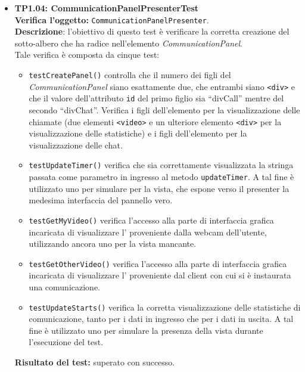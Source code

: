 \begin{itemize}
\item \textbf{TP1.04: CommunicationPanelPresenterTest}\\
\textbf{Verifica l'oggetto:} \texttt{CommunicationPanelPresenter}.\\
\textbf{Descrizione}: l'obiettivo di questo test è verificare la corretta creazione del sotto-albero che ha radice nell'elemento \textit{CommunicationPanel}.\\
Tale verifica è composta da cinque test:
\begin{itemize}
\item \texttt{testCreatePanel()} controlla che il numero dei figli del \textit{CommunicationPanel} siano esattamente due, che entrambi siano \texttt{<div>} e che il valore dell'attributo \texttt{id} del primo figlio sia ``divCall'' mentre del secondo ``divChat''. Verifica i figli dell'elemento per la visualizzazione delle chiamate (due elementi \texttt{<video>} e un ulteriore elemento \texttt{<div>} per la visualizzazione delle statistiche) e i figli dell'elemento per la visualizzazione delle chat.
\item \texttt{testUpdateTimer()} verifica che sia correttamente visualizzata la stringa passata come parametro in ingresso al metodo \texttt{updateTimer}. A tal fine è utilizzato uno  per simulare per la vista, che espone verso il presenter la medesima interfaccia del pannello vero.
\item \texttt{testGetMyVideo()} verifica l'accesso alla parte di interfaccia grafica incaricata di visualizzare l' proveniente dalla webcam dell'utente, utilizzando ancora uno  per la vista mancante.
\item \texttt{testGetOtherVideo()} verifica l'accesso alla parte di interfaccia grafica incaricata di visualizzare l' proveniente dal client con cui si è instaurata una comunicazione.
\item \texttt{testUpdateStarts()} verifica la corretta visualizzazione delle statistiche di comunicazione, tanto per i dati in ingresso che per i dati in uscita. A tal fine è utilizzato uno  per simulare la presenza della vista durante l'esecuzione del test.
\end{itemize}
\textbf{Risultato del test:} superato con successo.


\end{itemize}

